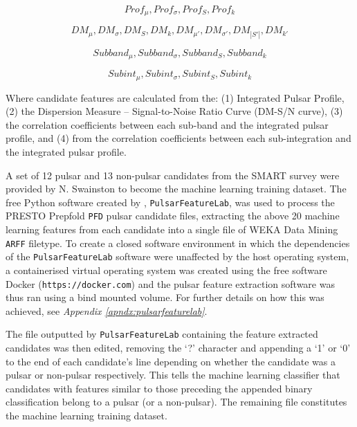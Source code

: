 \documentclass{article}
\begin{document}
\begin{equation}
    Prof_{\mu}, Prof_{\sigma}, Prof_{S}, Prof_{k}
\end{equation}

\begin{equation}
    DM_{\mu}, DM_{\sigma}, DM_{S},DM_{k},
    DM_{\mu'}, DM_{\sigma'}, DM_{|S'|},DM_{k'}
\end{equation}

\begin{equation}
    Subband_{\mu}, Subband_{\sigma}, Subband_{S}, Subband_{k}
\end{equation}

\begin{equation}
    Subint_{\mu}, Subint_{\sigma}, Subint_{S}, Subint_{k}
\end{equation}

Where candidate features are calculated from the: (1) Integrated Pulsar Profile, (2) the Dispersion Measure -- Signal-to-Noise Ratio Curve (DM-S/N curve), (3) the correlation coefficients between each sub-band and the integrated pulsar profile, and (4) from the correlation coefficients between each sub-integration and the integrated pulsar profile. 

A set of 12 pulsar and 13 non-pulsar candidates from the SMART survey were provided by N. Swainston to become the machine learning training dataset. The free Python software created by \textcite{lyon}, \verb|PulsarFeatureLab|, was used to process the PRESTO Prepfold \verb|PFD| pulsar candidate files, extracting the above 20 machine learning features from each candidate into a single file of WEKA Data Mining \verb|ARFF| filetype. To create a closed software environment in which the dependencies of the \verb|PulsarFeatureLab| software were unaffected by the host operating system, a containerised virtual operating system was created using the free software Docker (\verb|https://docker.com|) and the pulsar feature extraction software was thus ran using a bind mounted volume. For further details on how this was achieved, see \emph{Appendix \ref{apndx:pulsarfeaturelab}}.

The file outputted by \verb|PulsarFeatureLab| containing the feature extracted candidates was then edited, removing the `?' character and appending a `1' or `0' to the end of each candidate's line depending on whether the candidate was a pulsar or non-pulsar respectively. This tells the machine learning classifier that candidates with features similar to those preceding the appended binary classification belong to a pulsar (or a non-pulsar). The remaining file constitutes the machine learning training dataset.
\end{document}
